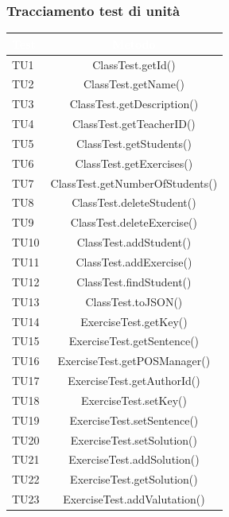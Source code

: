 \subsubsection{Tracciamento test di unità}
\begin{longtable}{|>{\centering\arraybackslash}m{1.6cm}|c|}		
 	\rowcolor{LightBlue}
		\textbf{\textcolor{white}{Test}}
		& \textbf{\textcolor{white}{Metodo}}\\ \hline
		TU1 & ClassTest.getId()\\ \hline
		\rowcolor{LightGray}
		TU2 & ClassTest.getName()\\ \hline
		TU3 & ClassTest.getDescription()\\ \hline
		\rowcolor{LightGray}
		TU4 & ClassTest.getTeacherID()\\ \hline
		TU5 & ClassTest.getStudents()\\ \hline
		\rowcolor{LightGray}
		TU6 & ClassTest.getExercises()\\ \hline
		TU7 & ClassTest.getNumberOfStudents()\\ \hline
		\rowcolor{LightGray}
		TU8 & ClassTest.deleteStudent()\\ \hline
		TU9 & ClassTest.deleteExercise()\\ \hline
		\rowcolor{LightGray}
		TU10 & ClassTest.addStudent()\\ \hline
		TU11 & ClassTest.addExercise()\\ \hline
		\rowcolor{LightGray}
		TU12 & ClassTest.findStudent()\\ \hline
		TU13 & ClassTest.toJSON()\\ \hline
		\rowcolor{LightGray}
		TU14 & ExerciseTest.getKey()\\ \hline
		TU15 & ExerciseTest.getSentence()\\ \hline
		\rowcolor{LightGray}
		TU16 & ExerciseTest.getPOSManager()\\ \hline
		TU17 & ExerciseTest.getAuthorId()\\ \hline
		\rowcolor{LightGray}
		TU18 & ExerciseTest.setKey()\\ \hline
		TU19 & ExerciseTest.setSentence()\\ \hline
		\rowcolor{LightGray}
		TU20 & ExerciseTest.setSolution()\\ \hline
		TU21 & ExerciseTest.addSolution()\\ \hline
		\rowcolor{LightGray}
		TU22 & ExerciseTest.getSolution()\\ \hline
		TU23 & ExerciseTest.addValutation()\\ \hline

\end{longtable}
